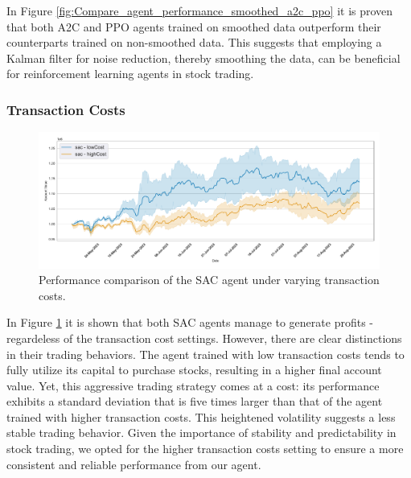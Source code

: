 \documentclass[12pt]{article}
\begin{document}
In Figure \ref{fig:Compare_agent_performance_smoothed_a2c_ppo} it is proven that both A2C and PPO agents trained on smoothed data outperform their counterparts trained on non-smoothed data. This suggests that employing a Kalman filter for noise reduction, thereby smoothing the data, can be beneficial for reinforcement learning agents in stock trading.


\subsubsection{Transaction Costs}

\begin{figure}[h]
    \centering
    \includegraphics[width=1\textwidth]{figs/Hyperparameter_tuning/Compare_agent_performance_lowTC_sac.pdf}
    \caption{Performance comparison of the SAC agent under varying transaction costs.}
    \label{fig:Compare_agent_performance_lowTC_sac}
\end{figure}


In Figure \ref{fig:Compare_agent_performance_lowTC_sac} it is shown that both SAC agents manage to generate profits - regardeless of the transaction cost settings. However, there are clear distinctions in their trading behaviors. The agent trained with low transaction costs tends to fully utilize its capital to purchase stocks, resulting in a higher final account value. Yet, this aggressive trading strategy comes at a cost: its performance exhibits a standard deviation that is five times larger than that of the agent trained with higher transaction costs. This heightened volatility suggests a less stable trading behavior. Given the importance of stability and predictability in stock trading, we opted for the higher transaction costs setting to ensure a more consistent and reliable performance from our agent.
\end{document}
